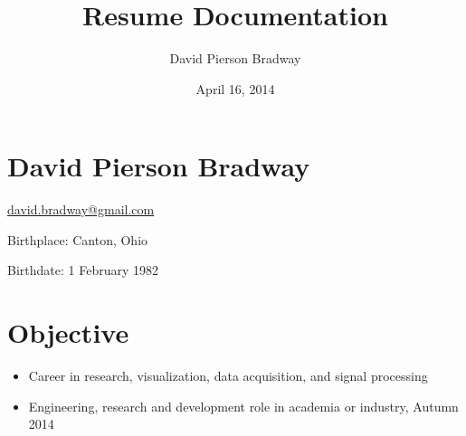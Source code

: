 \documentclass[letterpaper,10pt,english]{sphinxmanual}
\title{Resume Documentation}
\date{April 16, 2014}
\author{David Pierson Bradway}
\begin{document}
\maketitle
\tableofcontents
{}\label{index::doc}



\chapter{David Pierson Bradway}
\label{resume:web-enhanced-resume-cv}\label{resume::doc}\label{resume:david-pierson-bradway}
\begin{DUlineblock}{0em}
\item[] \href{mailto:david.bradway@gmail.com}{david.bradway@gmail.com}
\item[] Birthplace: Canton, Ohio
\item[] Birthdate: 1 February 1982
\end{DUlineblock}


\chapter{Objective}
\label{resume:objective}\begin{itemize}
\item {} 
Career in research, visualization, data acquisition, and signal
processing

\item {} 
Engineering, research and development role in academia or industry,
Autumn 2014

\end{itemize}
\end{document}
